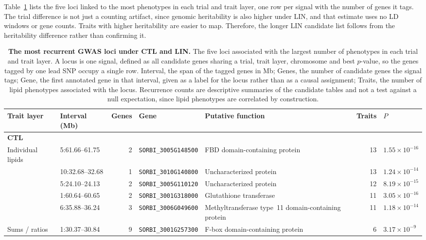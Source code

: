 \documentclass[9pt,twocolumn,twoside]{rilabRxiv}
\begin{document}
Table~\ref{tab:top_loci} lists the five loci linked to the most phenotypes in each trial and trait layer, one row per signal with the number of genes it tags. The trial difference is not just a counting artifact, since genomic heritability is also higher under LIN, and that estimate uses no LD windows or gene counts. Traits with higher heritability are easier to map. Therefore, the longer LIN candidate list follows from the heritability difference rather than confirming it.

\begin{table}[!ht]
\centering
\caption{\textbf{The most recurrent GWAS loci under CTL and LIN.} The five loci associated with the largest number of phenotypes in each trial and trait layer. A locus is one signal, defined as all candidate genes sharing a trial, trait layer, chromosome and best $p$-value, so the genes tagged by one lead SNP occupy a single row. Interval, the span of the tagged genes in Mb; Genes, the number of candidate genes the signal tags; Gene, the first annotated gene in that interval, given as a label for the locus rather than as a causal assignment; Traits, the number of lipid phenotypes associated with the locus. Recurrence counts are descriptive summaries of the candidate tables and not a test against a null expectation, since lipid phenotypes are correlated by construction.}
\label{tab:top_loci}
\scriptsize
\begin{tabular}{llrllrl}
\toprule
\textbf{Trait layer} & \textbf{Interval (Mb)} & \textbf{Genes} & \textbf{Gene} & \textbf{Putative function} & \textbf{Traits} & \textbf{$P$} \\
\midrule
\multicolumn{7}{l}{\textbf{CTL}} \\
Individual lipids & 5:61.66--61.75 & 2 & \texttt{SORBI\_3005G148500} & FBD domain-containing protein & 13 & $1.55\times10^{-16}$ \\
 & 10:32.68--32.68 & 1 & \texttt{SORBI\_3010G140800} & Uncharacterized protein & 13 & $1.24\times10^{-14}$ \\
 & 5:24.10--24.13 & 2 & \texttt{SORBI\_3005G110120} & Uncharacterized protein & 12 & $8.19\times10^{-15}$ \\
 & 1:60.64--60.65 & 2 & \texttt{SORBI\_3001G318000} & Glutathione transferase & 11 & $3.05\times10^{-16}$ \\
 & 6:35.88--36.24 & 3 & \texttt{SORBI\_3006G049600} & Methyltransferase type~11 domain-containing protein & 11 & $1.18\times10^{-14}$ \\
\addlinespace
Sums / ratios & 1:30.37--30.84 & 9 & \texttt{SORBI\_3001G257300} & F-box domain-containing protein & 6 & $3.17\times10^{-9}$ \\

\end{tabular}
\end{table}
\end{document}
